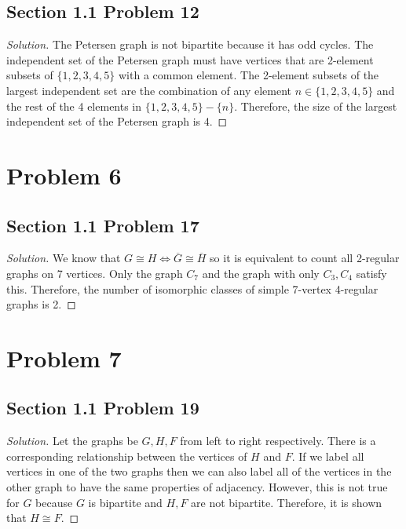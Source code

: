 \documentclass[12pt]{article}
\newenvironment{solution}{\begin{proof}[Solution]}{\end{proof}}
\begin{document}
\subsection*{Section 1.1 Problem 12}
\begin{solution}
    The Petersen graph is not bipartite because it has odd cycles. The independent
    set of the Petersen graph must have vertices that are 2-element subsets of
    \(\{1,2,3,4,5\}\) with a common element. The 2-element subsets of the largest
    independent set are the combination of any element \(n\in\{1,2,3,4,5\}\) and
    the rest of the 4 elements in \(\{1,2,3,4,5\}-\{n\}\). Therefore, the size of
    the largest independent set of the Petersen graph is 4.
\end{solution}

\section*{Problem 6}
\subsection*{Section 1.1 Problem 17}
\begin{solution}
    We know that \(G\cong H\iff\overline{G}\cong\overline{H}\) so it is
    equivalent to count all 2-regular graphs on 7 vertices. Only the graph
    \(C_7\) and the graph with only \(C_3,C_4\) satisfy this. Therefore, the
    number of isomorphic classes of simple 7-vertex 4-regular graphs is 2.
\end{solution}

\section*{Problem 7}
\subsection*{Section 1.1 Problem 19}
\begin{solution}
    Let the graphs be \(G,H,F\) from left to right respectively. There is a
    corresponding relationship between the vertices of \(H\) and \(F\). If we
    label all vertices in one of the two graphs then we can also label all of
    the vertices in the other graph to have the same properties of adjacency.
    However, this is not true for \(G\) because \(G\) is bipartite and \(H,F\)
    are not bipartite. Therefore, it is shown that \(H\cong F\).
\end{solution}
\end{document}
